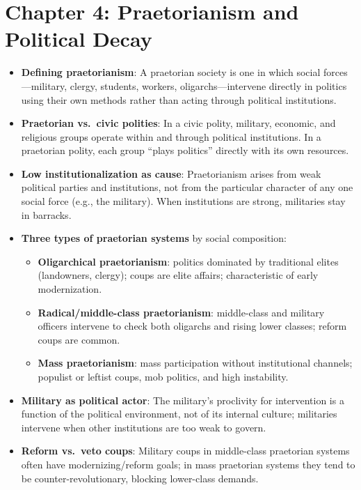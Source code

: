 \documentclass[12pt]{article}
\begin{document}
\section{Chapter 4: Praetorianism and Political Decay}

\begin{itemize}[leftmargin=*, itemsep=4pt]
    \item \textbf{Defining praetorianism}: A praetorian society is one in which social forces---military, clergy, students, workers, oligarchs---intervene directly in politics using their own methods rather than acting through political institutions.
    \item \textbf{Praetorian vs.\ civic polities}: In a civic polity, military, economic, and religious groups operate within and through political institutions. In a praetorian polity, each group ``plays politics'' directly with its own resources.
    \item \textbf{Low institutionalization as cause}: Praetorianism arises from weak political parties and institutions, not from the particular character of any one social force (e.g., the military). When institutions are strong, militaries stay in barracks.
    \item \textbf{Three types of praetorian systems} by social composition:
        \begin{itemize}
            \item \textbf{Oligarchical praetorianism}: politics dominated by traditional elites (landowners, clergy); coups are elite affairs; characteristic of early modernization.
            \item \textbf{Radical/middle-class praetorianism}: middle-class and military officers intervene to check both oligarchs and rising lower classes; reform coups are common.
            \item \textbf{Mass praetorianism}: mass participation without institutional channels; populist or leftist coups, mob politics, and high instability.
        \end{itemize}
    \item \textbf{Military as political actor}: The military's proclivity for intervention is a function of the political environment, not of its internal culture; militaries intervene when other institutions are too weak to govern.
    \item \textbf{Reform vs.\ veto coups}: Military coups in middle-class praetorian systems often have modernizing/reform goals; in mass praetorian systems they tend to be counter-revolutionary, blocking lower-class demands.

\end{itemize}
\end{document}
